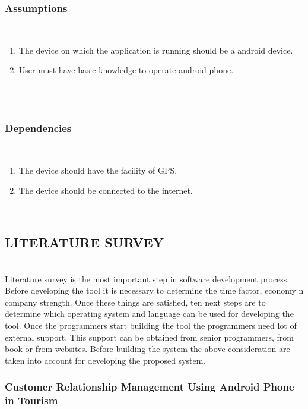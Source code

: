 \documentclass[12pt,a4paper]{article}
\begin{document}
\subsubsection{Assumptions}
\\
\begin{enumerate}
\item The device on which the application is running should be a android device.
\item User must have basic knowledge to operate android phone.
\end{enumerate}
\\
\\
\subsubsection{Dependencies}
\\
\begin{enumerate}
\item The device should have the facility of GPS.
\item The device should be connected to the internet.
\end{enumerate}
\\
\subsection{LITERATURE SURVEY}
\\ 
\hspace{0.7 cm}Literature survey is the most important step in software development process. Before developing the tool it is necessary to determine the time factor, economy n company strength. Once these things are satisfied, ten next steps are to determine which operating system and language can be used for developing the tool. Once the programmers start building the tool the programmers need lot of external support. This support can be obtained from senior programmers, from book or from websites. Before building the system the above consideration are taken into account for developing the proposed system.
\\
\subsubsection{Customer Relationship Management Using Android Phone in Tourism}
\end{document}
